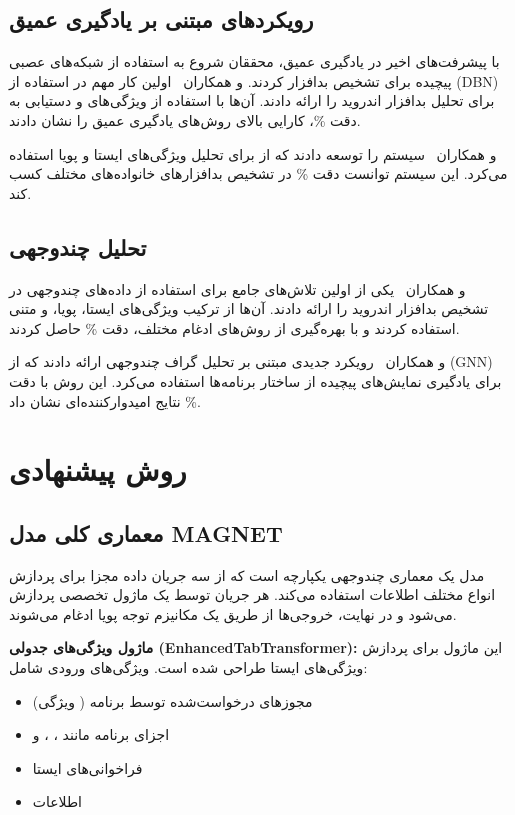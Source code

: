\documentclass[a4paper,11pt]{article}
\begin{document}
\subsection{رویکردهای مبتنی بر یادگیری عمیق}
با پیشرفت‌های اخیر در یادگیری عمیق، محققان شروع به استفاده از شبکه‌های عصبی پیچیده برای تشخیص بدافزار کردند.  و همکاران~\cite{DeepDroid} اولین کار مهم در استفاده از  (DBN) برای تحلیل بدافزار اندروید را ارائه دادند. آن‌ها با استفاده از ویژگی‌های  و دستیابی به دقت \%، کارایی بالای روش‌های یادگیری عمیق را نشان دادند.

 و همکاران~\cite{DroidDeepLearner} سیستم  را توسعه دادند که از  برای تحلیل ویژگی‌های ایستا و پویا استفاده می‌کرد. این سیستم توانست دقت \% در تشخیص بدافزارهای خانواده‌های مختلف کسب کند.

\subsection{تحلیل چندوجهی}
 و همکاران~\cite{DroidMultiModal} یکی از اولین تلاش‌های جامع برای استفاده از داده‌های چندوجهی در تشخیص بدافزار اندروید را ارائه دادند. آن‌ها از ترکیب ویژگی‌های ایستا، پویا، و متنی استفاده کردند و با بهره‌گیری از روش‌های ادغام مختلف، دقت \% حاصل کردند.

 و همکاران~\cite{MultiModalGraphML} رویکرد جدیدی مبتنی بر تحلیل گراف چندوجهی ارائه دادند که از  (GNN) برای یادگیری نمایش‌های پیچیده از ساختار برنامه‌ها استفاده می‌کرد. این روش با دقت \% نتایج امیدوارکننده‌ای نشان داد.

\section{روش پیشنهادی}
\subsection{معماری کلی مدل MAGNET}
مدل  یک معماری چندوجهی یکپارچه است که از سه جریان داده مجزا برای پردازش انواع مختلف اطلاعات استفاده می‌کند. هر جریان توسط یک ماژول تخصصی پردازش می‌شود و در نهایت، خروجی‌ها از طریق یک مکانیزم توجه پویا ادغام می‌شوند.

\textbf{ماژول ویژگی‌های جدولی (EnhancedTabTransformer):}
این ماژول برای پردازش ویژگی‌های ایستا طراحی شده است. ویژگی‌های ورودی شامل:
\begin{itemize}
  \item مجوزهای درخواست‌شده توسط برنامه ( ویژگی)
  \item اجزای برنامه مانند ، ، و 
  \item فراخوانی‌های  ایستا
  \item اطلاعات 
\end{itemize}
\end{document}
